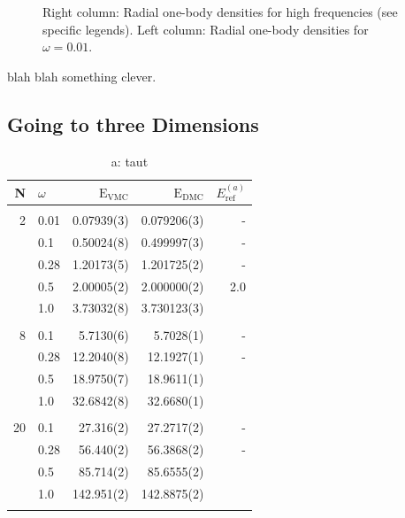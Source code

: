 \begin{figure}
\begin{center}
\begin{tabular}{lr}
  \end{tabular}
  \caption{Right column: Radial one-body densities for high frequencies (see specific legends). Left column: Radial one-body densities for $\omega=0.01$.}
  \label{fig:OBD_collapsed_w001}
 \end{center}
\end{figure}

\setlength{\tabcolsep}{6pt}
\captionsetup[subfloat]{labelformat=parens}


blah blah something clever.


\subsection{Going to three Dimensions}

\begin{table}
\begin{center}
\begin{tabular}{rl|rrr}
    N     & $\omega$ & $\mathrm{E_{VMC}}$ & $\mathrm{E_{DMC}}$ & $E_\mathrm{ref}^{(a)}$\\
\hline\hline
\multicolumn{5}{c}{} \\
    2     &   0.01   & 0.07939(3)  & 0.079206(3) & -		\\
          &   0.1    & 0.50024(8)  & 0.499997(3) & - 		\\
          &   0.28   & 1.20173(5)  & 1.201725(2) & -		\\
          &   0.5    & 2.00005(2)  & 2.000000(2) & 2.0 \\
          &   1.0    & 3.73032(8)  & 3.730123(3) & \\
\cline{2-5}
\multicolumn{5}{c}{} \\
    8     &   0.1    & 5.7130(6)   & 5.7028(1)   & - 		\\
          &   0.28   & 12.2040(8)  & 12.1927(1)   & -		\\
          &   0.5    & 18.9750(7)  & 18.9611(1) & \\
          &   1.0    & 32.6842(8)  & 32.6680(1)  & \\
\cline{2-5}
\multicolumn{5}{c}{} \\
    20    &   0.1    & 27.316(2)   & 27.2717(2)   & - 		\\
          &   0.28   & 56.440(2)   & 56.3868(2)   & -		\\
          &   0.5    & 85.714(2)   & 85.6555(2)  &  \\
          &   1.0    & 142.951(2)  & 142.8875(2)  & \\
\cline{2-5}
\multicolumn{5}{c}{} \\

     
\hline\hline
\end{tabular}
\caption{a: taut}
\label{tab:QDotsResults3D}
\end{center}
\end{table}

